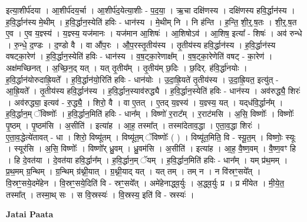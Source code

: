 \documentclass[17pt]{extarticle}
\begin{document}
इत्या॒शीर्प॑दया । आ॒शीर्प॑दय॒र्चा । आ॒शीर्प॑द॒येत्या॒शीः - प॒द॒या॒ । ऋ॒चा दक्षि॑णस्य । दक्षि॑णस्य हवि॒र्द्धान॑स्य । ह॒वि॒र्द्धान॑स्य मे॒थीम् । ह॒वि॒र्द्धान॒स्येति॑ हविः - धान॑स्य । मे॒थीम् नि । नि ह॑न्ति । ह॒न्ति॒ शी॒र्॒.ष॒तः । शी॒र्॒.ष॒त ए॒व । ए॒व य॒ज्ञ्स्य॑ । य॒ज्ञ्स्य॒ यज॑मानः । यज॑मान आ॒शिषः॑ । आ॒शिषोऽव॑ । आ॒शिष॒ इत्या᳚ - शिषः॑ । अव॑ रुन्धे । रु॒न्धे॒ द॒ण्डः । द॒ण्डो वै । वा औ॑प॒रः । औ॒प॒रस्तृ॒तीय॑स्य । तृ॒तीय॑स्य हवि॒र्द्धान॑स्य । ह॒वि॒र्द्धान॑स्य वषट्का॒रेण॑ । ह॒वि॒र्द्धान॒स्येति॑ हविः - धान॑स्य । व॒ष॒ट्का॒रेणाक्ष᳚म् । व॒ष॒ट्का॒रेणेति॑ वषट् - का॒रेण॑ । अक्ष॑मच्छिनत् । अ॒च्छि॒न॒द् यत् । यत् तृ॒तीय᳚म् । तृ॒तीय॑म् छ॒दिः । छ॒दिर्. ह॑वि॒र्द्धा॑नयोः । ह॒वि॒र्द्धान॑योरुदाह्रि॒यते᳚ । ह॒वि॒र्द्धान॑यो॒रिति॑ हविः - धान॑योः । उ॒दा॒ह्रि॒यते॑ तृ॒तीय॑स्य । उ॒दा॒ह्रि॒यत॒ इत्यु॑त् - आ॒ह्रि॒यते᳚ । तृ॒तीय॑स्य हवि॒र्द्धान॑स्य । ह॒वि॒र्द्धान॒स्याव॑रुद्ध्यै । ह॒वि॒र्द्धान॒स्येति॑ हविः - धान॑स्य । अव॑रुद्ध्यै॒ शिरः॑ । अव॑रुद्ध्या॒ इत्यव॑ - रु॒द्ध्यै॒ । शिरो॒ वै । वा ए॒तत् । ए॒तद् य॒ज्ञ्स्य॑ । य॒ज्ञ्स्य॒ यत् । यद्‍ध॑वि॒र्द्धान᳚म् । ह॒वि॒र्द्धान॒म् ॅविष्णोः᳚ । ह॒वि॒र्द्धान॒मिति॑ हविः - धान᳚म् । विष्णो॑ र॒राट᳚म् । र॒राट॑मसि । अ॒सि॒ विष्णोः᳚ । विष्णोः᳚ पृ॒ष्ठम् । पृ॒ष्ठम॑सि । अ॒सीति॑ । इत्या॑ह । आ॒ह॒ तस्मा᳚त् । तस्मा॑देताव॒द्धा । ए॒ता॒व॒द्धा शिरः॑ । ए॒ता॒व॒द्धेत्ये॑तावत् - धा । शिरो॒ विष्यू॑तम् । विष्यू॑त॒म् ॅविष्णोः᳚ ( ) । विष्यू॑त॒मिति॒ वि - स्यू॒त॒म् । विष्णोः॒ स्यूः । स्यूर॑सि । अ॒सि॒ विष्णोः᳚ । विष्णो᳚र् ध्रु॒वम् । ध्रु॒वम॑सि । अ॒सीति॑ । इत्या॑ह । आ॒ह॒ वै॒ष्ण॒वम् । वै॒ष्ण॒वꣳ हि । हि दे॒वत॑या । दे॒वत॑या हवि॒र्द्धान᳚म् । ह॒वि॒र्द्धान॒म् ॅयम् । ह॒वि॒र्द्धान॒मिति॑ हविः - धान᳚म् । यम् प्र॑थ॒मम् । प्र॒थ॒मम् ग्र॒न्थिम् । ग्र॒न्थिम् ग्र॑थ्नी॒यात् । ग्र॒थ्नी॒याद् यत् । यत् तम् । तम् न । न वि॑स्रꣳ॒॒सये᳚त् । वि॒स्रꣳ॒॒सये॒दमे॑हेन । वि॒स्रꣳ॒॒सये॒दिति॑ वि - स्रꣳ॒॒सये᳚त् । अमे॑हेनाद्ध्व॒र्युः । अ॒द्ध्व॒र्युः प्र । प्र मी॑येत । मी॒ये॒त॒ तस्मा᳚त् । तस्मा॒थ् सः । स वि॒स्रस्यः॑ । वि॒स्रस्य॒ इति॑ वि - स्रस्यः॑ । \newline

\textbf{Jatai Paata} \newline
\end{document}
